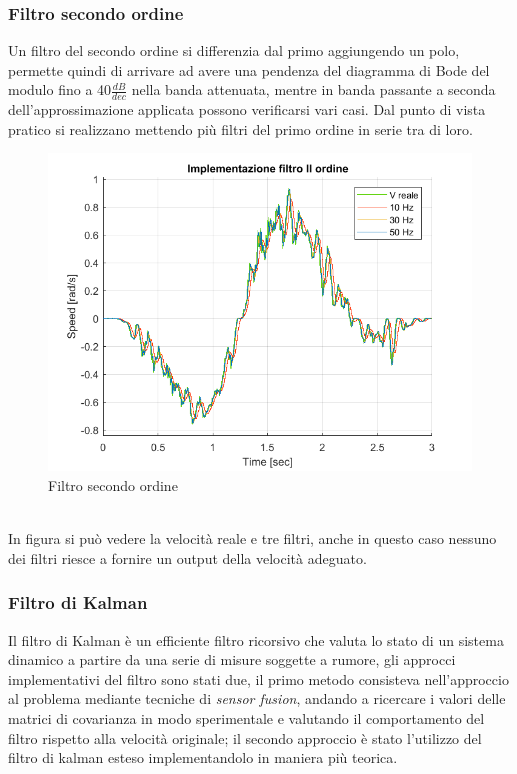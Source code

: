 \subsubsection*{Filtro secondo ordine}
Un filtro del secondo ordine si differenzia dal primo aggiungendo un polo, permette quindi di arrivare ad avere una pendenza del diagramma di Bode del modulo fino a 40$\frac{dB}{dec}$ nella banda attenuata, mentre in banda passante a seconda dell'approssimazione applicata possono verificarsi vari casi. Dal punto di vista pratico si realizzano mettendo più filtri del primo ordine in serie tra di loro. 
\begin{figure}[ht]
	\begin{center}
		\includegraphics[scale=0.5]{Immagini/Traiettorie/FiltroIIOrdine}
		\caption{Filtro secondo ordine}
		\label{fig:filtroIIOrd}
	\end{center}
\end{figure}
\\In figura si può vedere la velocità reale e tre filtri, anche in questo caso nessuno dei filtri riesce a fornire un output della velocità adeguato. 
\subsubsection*{Filtro di Kalman}
Il filtro di Kalman è un efficiente filtro ricorsivo che valuta lo stato di un sistema dinamico a partire da una serie di misure soggette a rumore, gli approcci implementativi del filtro sono stati due, il primo metodo consisteva nell'approccio al problema mediante tecniche di \textit{sensor fusion}, andando a ricercare i valori delle matrici di covarianza in modo sperimentale e valutando il comportamento del filtro rispetto alla velocità originale; il secondo approccio è stato l'utilizzo del filtro di kalman esteso implementandolo in maniera più teorica.
